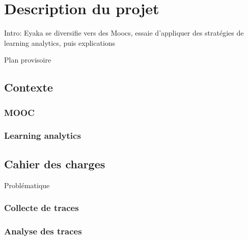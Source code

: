 \chapter{Description du projet}

    Intro: Eyaka se diversifie vers des Moocs, essaie d'appliquer des stratégies de learning analytics, puis explications


    Plan provisoire

    \section{Contexte}
        \subsection{MOOC}
        \subsection{Learning analytics}


    \section{Cahier des charges}

        Problématique

        \subsection{Collecte de traces}


        \subsection{Analyse des traces}